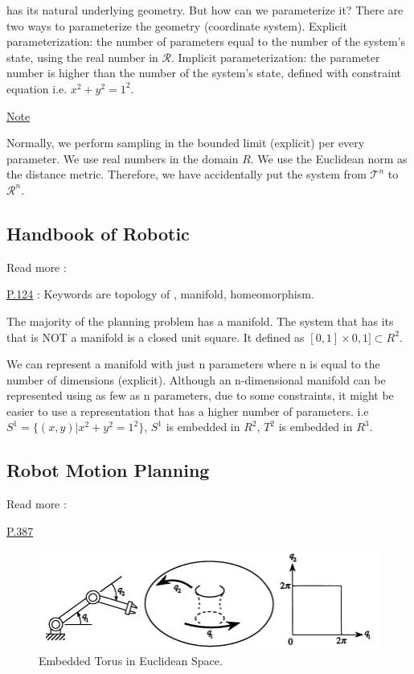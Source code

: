 \cs has its natural underlying geometry. But how can we parameterize it? There are two ways to parameterize the geometry (coordinate system). Explicit parameterization: the number of parameters equal to the number of the system's state, using the real number in $\mathcal{R}$. Implicit parameterization: the parameter number is higher than the number of the system's state, defined with constraint equation i.e. $x^2 + y^2 = 1^2$.

\noindent \underline{Note}

Normally, we perform sampling in the bounded limit (explicit) per every parameter. We use real numbers in the domain $R$. We use the Euclidean norm as the distance metric. Therefore, we have accidentally put the system from $\mathcal{T}^n$ to $\mathcal{R}^n$.







\subsection{Handbook of Robotic}
Read more : \cite{kavraki2016motion}

\noindent \underline{P.124} : Keywords are topology of \cs, manifold, homeomorphism.

The majority of the planning problem has a \cs manifold. The system that has its \cs that is NOT a manifold is a closed unit square. It defined as $[0,1] \times 0,1] \subset R^2$.

We can represent a \cs manifold with just n parameters where n is equal to the number of dimensions (explicit). Although an n-dimensional manifold can be represented using as few as n parameters, due to some constraints, it might be easier to use a representation that has a higher number of parameters. i.e $S^1 = \{(x,y) | x^2 + y^2 = 1^2\}$, $S^1$ is embedded in $R^2$, $T^2$ is embedded in $R^3$.


\subsection{Robot Motion Planning}
Read more : \cite{latombe2012robot}

\noindent \underline{P.387}

\begin{figure}[htbp]
    \centering
    \includegraphics[width=0.5\linewidth]{src/torus/latombe_fig1.png}
    \caption{Embedded Torus in Euclidean Space.}
\end{figure}


